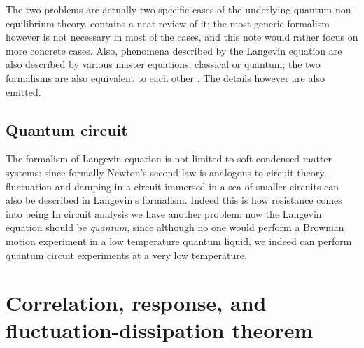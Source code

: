 \documentclass[hyperref, a4paper]{article}
\begin{document}
The two problems are actually two specific cases 
of the underlying quantum non-equilibrium theory.
\cite{sieberer2016keldysh} contains a neat review of it; 
the most generic formalism however is not necessary 
in most of the cases, 
and this note would rather focus on more concrete cases.
Also, phenomena described by the Langevin equation 
are also described by various master equations,
classical or quantum;
the two formalisms are also equivalent to each other
\cite{van1997langevin,coppola2023lindblad}.
The details however are also emitted.

\subsection{Quantum circuit}

The formalism of Langevin equation is not limited to soft condensed matter systems:
since formally Newton's second law 
is analogous to circuit theory,
fluctuation and damping in a circuit immersed in 
a sea of smaller circuits can also be described in Langevin's formalism.
Indeed this is how resistance comes into being 
In circuit analysis we have another problem:
now the Langevin equation should be \emph{quantum},
since although no one would perform a Brownian motion experiment 
in a low temperature quantum liquid,
we indeed can perform quantum circuit experiments 
at a very low temperature.


\section{Correlation, response, and fluctuation-dissipation theorem} 
\end{document}
